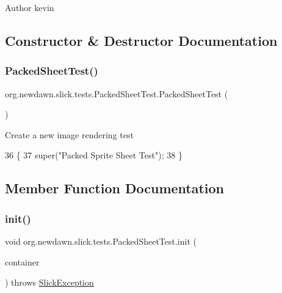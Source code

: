 \begin{DoxyAuthor}{Author}
kevin 
\end{DoxyAuthor}


\subsection{Constructor \& Destructor Documentation}
\mbox{\label{classorg_1_1newdawn_1_1slick_1_1tests_1_1_packed_sheet_test_a86041b335949cf5c245c09409e40936d}} 
\subsubsection{\texorpdfstring{Packed\+Sheet\+Test()}{PackedSheetTest()}}
{\footnotesize\ttfamily org.\+newdawn.\+slick.\+tests.\+Packed\+Sheet\+Test.\+Packed\+Sheet\+Test (\begin{DoxyParamCaption}{ }\end{DoxyParamCaption})\hspace{0.3cm}{\ttfamily [inline]}}

Create a new image rendering test 
\begin{DoxyCode}
36                              \{
37         super(\textcolor{stringliteral}{"Packed Sprite Sheet Test"});
38     \}
\end{DoxyCode}


\subsection{Member Function Documentation}
\mbox{\label{classorg_1_1newdawn_1_1slick_1_1tests_1_1_packed_sheet_test_a598c8ee4cfd76482f2f897bc27c818d0}} 
\subsubsection{\texorpdfstring{init()}{init()}}
{\footnotesize\ttfamily void org.\+newdawn.\+slick.\+tests.\+Packed\+Sheet\+Test.\+init (\begin{DoxyParamCaption}\item[{\mbox{\hyperlink{classorg_1_1newdawn_1_1slick_1_1_game_container}{Game\+Container}}}]{container }\end{DoxyParamCaption}) throws \mbox{\hyperlink{classorg_1_1newdawn_1_1slick_1_1_slick_exception}{Slick\+Exception}}\hspace{0.3cm}{\ttfamily [inline]}}

